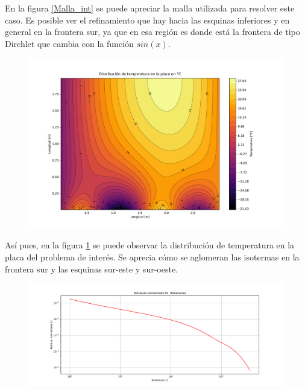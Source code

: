 \documentclass[article,latterpaper]{IEEEtran}
\begin{document}
En la figura \ref{Malla_int} se puede apreciar la malla utilizada para resolver este caso. Es posible ver el refinamiento que hay hacia las esquinas inferiores y en general en la frontera sur, ya que en esa región es donde está la frontera de tipo Dirchlet que cambia con la función $sin(x)$.

\begin{figure}[H]
    \centering
    \includegraphics[scale=0.25]{Caso_interes/Dist_T.pdf}
    \caption{ }
    \label{T_int}
\end{figure}

Así pues, en la figura \ref{T_int} se puede observar la distribución de temperatura en la placa del problema de interés. Se aprecia cómo se aglomeran las isotermas en la frontera sur y las esquinas sur-este y sur-oeste.

\begin{figure}[H]
    \centering
    \includegraphics[scale=0.2]{Caso_interes/Residuales.pdf}
    \caption{ }
    \label{Res_int}
\end{figure}
\end{document}
